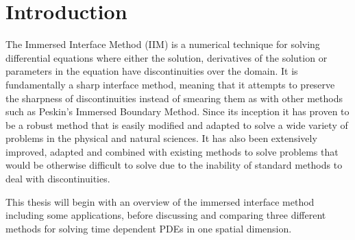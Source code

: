\section*{Introduction}
The Immersed Interface Method (IIM) is a numerical technique for solving differential equations where either the solution, derivatives of the solution or parameters in the equation have discontinuities over the domain.
It is fundamentally a sharp interface method, meaning that it attempts to preserve the sharpness of discontinuities instead of smearing them as with other methods such as Peskin's Immersed Boundary Method.
Since its inception it has proven to be a robust method that is easily modified and adapted to solve a wide variety of problems in the physical and natural sciences. 
It has also been extensively improved, adapted and combined with existing methods to solve problems that would be otherwise difficult to solve due to the inability of standard methods to deal with discontinuities.

This thesis will begin with an overview of the immersed interface method including some applications, before discussing and comparing three different methods for solving time dependent PDEs in one spatial dimension.
